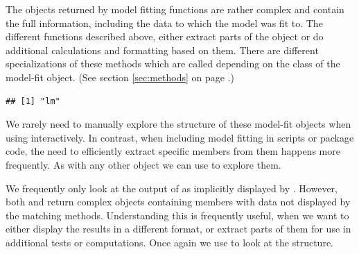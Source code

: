 \documentclass[krantz2]{krantz}\usepackage{knitr}
\begin{document}
\begin{explainbox}
The objects returned by model fitting functions are rather complex and contain the full information, including the data to which the model was fit to. The different functions described above, either extract parts of the object or do additional calculations and formatting based on them. There are different specializations of these methods which are called depending on the class of the model-fit object. (See section \ref{sec:methods} on page \pageref{sec:methods}.)

\begin{knitrout}\footnotesize
{}\color{fgcolor}\begin{kframe}
\begin{alltt}
\end{alltt}
\begin{verbatim}
## [1] "lm"
\end{verbatim}
\end{kframe}
\end{knitrout}

We rarely need to manually explore the structure of these model-fit objects when using \Rlang interactively. In contrast, when including model fitting in scripts or package code, the need to efficiently extract specific members from them happens more frequently. As with any other \Rlang object we can use  to explore them.

\begin{knitrout}\footnotesize
{}\color{fgcolor}\begin{kframe}
\begin{alltt}
  \hlstd{=} \hlstd{)} 
\end{alltt}
\end{kframe}
\end{knitrout}

We frequently only look at the output of  as implicitly displayed by . However, both  and  return complex objects containing members with data not displayed by the matching  methods. Understanding this is frequently useful, when we want to either display the results in a different format, or extract parts of them for use in additional tests or computations. Once again we use  to look at the structure.


\end{explainbox}
\end{document}
